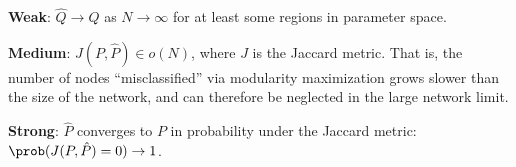 \documentclass[english]{scrartcl}
\begin{document}
		\begin{conj}
			\textbf{Weak}: $\hat{Q} \rightarrow Q$ as $N \rightarrow \infty$ for at least some regions in parameter space.  
		\end{conj}

		\begin{conj}
			\textbf{Medium}: $J(P, \hat{P}) \in o(N)$, where $J$ is the Jaccard metric. That is, the number of nodes ``misclassified'' via modularity maximization grows slower than the size of the network, and can therefore be neglected in the large network limit. 
		\end{conj}

		\begin{conj}
			\textbf{Strong}: $\hat{P}$ converges to $P$ in probability under the Jaccard metric: $\prob(J(P, \hat{P}) = 0) \rightarrow 1$.
		\end{conj}


{}

\end{document}
